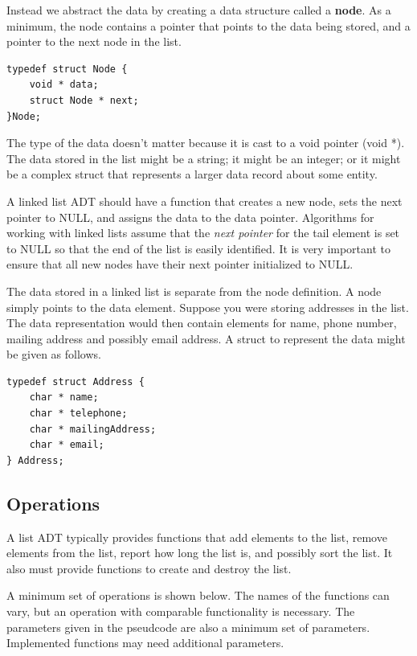 Instead we abstract the data by creating a data structure called a \textbf{node}.  As a minimum, the node contains  a pointer that points to the data being stored,  and a pointer to the next node in the list. 

\begin{lstlisting}
typedef struct Node {
    void * data;
    struct Node * next;
}Node;
\end{lstlisting}

The type of the data doesn't matter because it is cast to a void pointer (void *).   The data stored in the list might be a string; it might be an integer; or it might be a complex struct that represents a larger data record about some entity.

A linked list ADT should have a function that creates a new node,  sets the next pointer to NULL, and assigns the data to the data pointer.    Algorithms for working with linked lists assume that the \emph{\textit{next pointer}} for the tail element  is set to NULL so that the end of the list is easily identified.   It is very important to ensure that all new nodes have their next pointer initialized to NULL.

The data stored in a linked list is separate from the node definition.  A node simply points to the data element.  Suppose you were storing addresses in the list. The  data representation would then contain elements for name, phone number, mailing address and possibly email address.   A struct to represent the data might be given as follows.

\begin{lstlisting}
typedef struct Address {
    char * name;
    char * telephone;
    char * mailingAddress;
    char * email;
} Address;
\end{lstlisting}


\subsection{Operations}

A list ADT typically provides functions  that add elements to the list,  remove elements from the list,  report how long the list is,  and possibly sort the list.    It also must provide functions to create and destroy the list.

A minimum set of operations is shown below.  The names of the functions can vary, but an operation with comparable functionality is necessary.    The parameters given in the pseudcode are also a minimum set of parameters.  Implemented functions may need additional parameters. 

